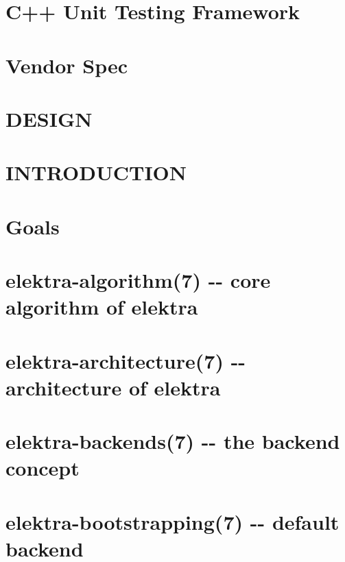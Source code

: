 \documentclass[twoside]{book}
\newcommand{\+}{\discretionary{\mbox{\scriptsize$\hookleftarrow$}}{}{}}
\begin{document}
\chapter{C++ Unit Testing Framework}
\label{doc_decisions_unit_testing_md}
\hypertarget{doc_decisions_unit_testing_md}{}

\chapter{Vendor Spec}
\label{doc_decisions_vendor_spec_md}
\hypertarget{doc_decisions_vendor_spec_md}{}

\chapter{D\+E\+S\+I\+G\+N}
\label{doc_DESIGN_md}
\hypertarget{doc_DESIGN_md}{}

\chapter{I\+N\+T\+R\+O\+D\+U\+C\+T\+I\+O\+N}
\label{doc_GIT_md}
\hypertarget{doc_GIT_md}{}

\chapter{Goals}
\label{doc_GOALS_md}
\hypertarget{doc_GOALS_md}{}

\chapter{elektra-\/algorithm(7) -\/-\/ core algorithm of elektra}
\label{md_doc_help_elektra-algorithm}
\hypertarget{md_doc_help_elektra-algorithm}{}

\chapter{elektra-\/architecture(7) -\/-\/ architecture of elektra}
\label{md_doc_help_elektra-architecture}
\hypertarget{md_doc_help_elektra-architecture}{}

\chapter{elektra-\/backends(7) -\/-\/ the backend concept}
\label{md_doc_help_elektra-backends}
\hypertarget{md_doc_help_elektra-backends}{}

\chapter{elektra-\/bootstrapping(7) -\/-\/ default backend}
\label{md_doc_help_elektra-bootstrapping}
\hypertarget{md_doc_help_elektra-bootstrapping}{}

\end{document}
